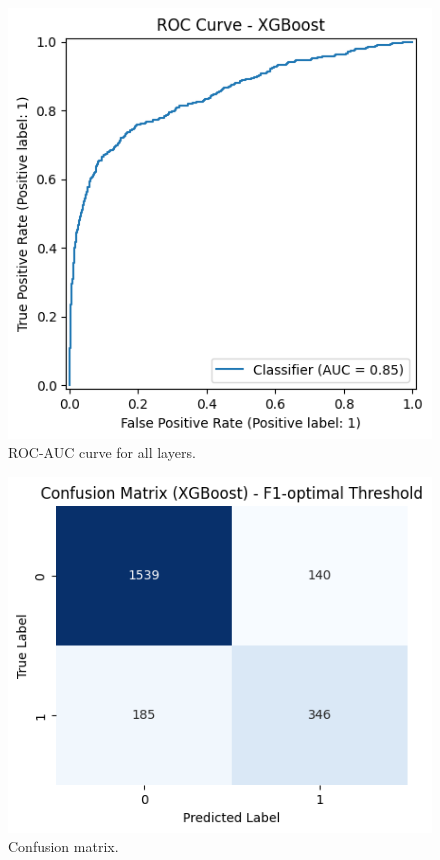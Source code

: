 \begin{figure}[htbp]
    \centerline{\includegraphics[width=\linewidth]{fig9.png}}
    \caption{ROC-AUC curve for all layers.}
    \label{fig:all-layers}
\end{figure}
\begin{figure}[htbp]
    \centerline{\includegraphics[width=\linewidth]{fig10.png}}
    \caption{Confusion matrix.}
    \label{fig:confusion-matrix}
\end{figure}

